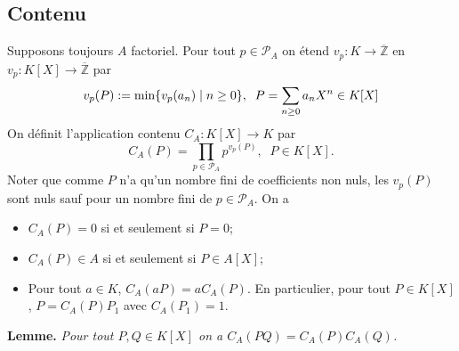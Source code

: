 \documentclass[a4paper, oneside, 12pt]{book}
\theoremstyle{theoremeStyle} %
\theoremstyle{definition} %
\newcommand{\Z}{\mathbb{Z}}
\begin{document}
\subsection{Contenu}\label{Contenu}Supposons toujours $A$ factoriel. Pour tout $p\in\mathcal{P}_A$ on étend $v_p:K\rightarrow \overline{\Z} $ en   $v_p:K[X]\rightarrow \overline{\Z}$ par
$$v_p(P):=\hbox{\rm min}\lbrace v_p(a_n)\;|\; n\geq 0\rbrace,\;\; P=\sum_{n\geq 0} a_nX^n\in K[X]$$
  On définit l'application contenu $C_A:K[X]\rightarrow K$ par
$$C_A(P)=\prod_{p\in \mathcal{P}_A}p^{v_p(P)},\;\; P\in K[X].$$
Noter que comme $P$ n'a qu'un nombre fini de coefficients non nuls, les $v_p(P)$ sont nuls sauf pour un nombre fini de $p\in\mathcal{P}_A$. On a
\begin{itemize}
\item $C_A(P)=0$ si et seulement si $P=0$;
\item $C_A(P)\in A$ si et seulement si $P\in A[X]$;
\item Pour tout $a\in K $, $C_A(aP)=aC_A(P)$. En particulier, pour tout $P\in K[X]$, $P=C_A(P)P_1$ avec $C_A(P_1)=1$.  \\
\end{itemize}

\textbf{Lemme.} \textit{Pour tout $P,Q\in K[X]$ on a $C_A(PQ)=C_A(P)C_A(Q)$.}
\end{document}
